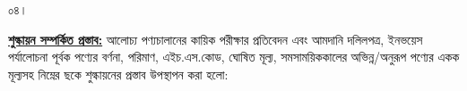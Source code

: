 \documentclass[12pt]{article}
\newcommand{\ircno}{\jealirc}
\newcommand{\ircrenewdt}{৩০/০৬/২০২২ ইং}
\newcommand{\musokr}{ডিসেম্বর-২১}
\begin{document}
\begin{minipage}[t]{0.05\linewidth}
০৪।
\end{minipage}
\begin{minipage}[t]{0.95\linewidth}
\underline{\textbf{শুল্কায়ন সম্পর্কিত প্রস্তাব:}}
আলোচ্য পণ্যচালানের কায়িক পরীক্ষার প্রতিবেদন এবং আমদানি দলিলপত্র,
ইনভয়েস পর্যালোচনা পূর্বক পণ্যের বর্ণনা, পরিমাণ, এইচ.এস.কোড, ঘোষিত মূল্য,
সমসাময়িককালের অভিন্ন/অনুরূপ পণ্যের একক মূল্যসহ নিম্নের ছকে শুল্কায়নের প্রস্তাব উপস্থাপন
করা হলো:
\end{minipage}
\end{document}
